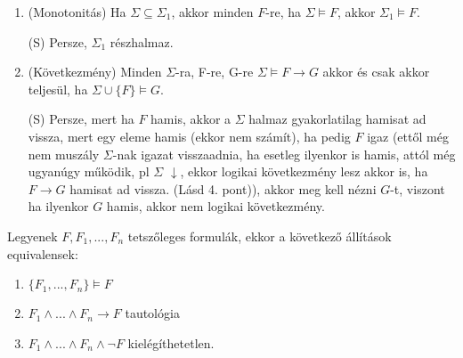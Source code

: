 \documentclass[10pt]{article}
\renewcommand{\\}{\par\noindent}
\begin{document}
\begin{frame}
\begin{tcolorbox}[title={Ész}]
\begin{enumerate}
{\tiny (S) 3. 5. 8. pontok összekombinálása eggyé.}\\
\item (Monotonitás) Ha $\Sigma \subseteq {\Sigma}_1$, akkor minden $F$-re, ha $\Sigma \models F$, akkor ${\Sigma}_1 \models F$.\\
{\tiny (S) Persze, ${\Sigma}_1$ részhalmaz.}\\
\item (Következmény) Minden $\Sigma$-ra, F-re, G-re $\Sigma \models F \rightarrow G$ akkor és csak akkor teljesül, ha $\Sigma \cup \{F\} \models G$.\\
{\tiny (S) Persze, mert ha $F$ hamis, akkor a $\Sigma$ halmaz gyakorlatilag hamisat ad vissza, mert egy eleme hamis (ekkor nem számít), ha pedig $F$ igaz (ettől még nem muszály $\Sigma$-nak igazat visszaadnia, ha esetleg ilyenkor is hamis, attól még ugyanúgy működik, pl $\Sigma$ $\downarrow$, ekkor logikai következmény lesz akkor is, ha $F \rightarrow G$ hamisat ad vissza. (Lásd 4. pont)), akkor meg kell nézni $G$-t, viszont ha ilyenkor $G$ hamis, akkor nem logikai következmény.}
\end{enumerate}
\end{tcolorbox}

\end{frame}

\begin{frame}

\begin{tcolorbox}[title={tétel: Ekvivalens állítások formulákra}]
Legyenek $F, F_1, ... , F_n$ tetszőleges formulák, ekkor a következő állítások equivalensek:
\begin{enumerate}
\item $\{F_1, ... , F_n\} \models F$
\item $F_1 \land ... \land F_n \rightarrow F$ tautológia
\item $F_1 \land ... \land F_n \land \neg F$ kielégíthetetlen.
\end{enumerate}
\end{tcolorbox}

\end{frame}
\end{document}
